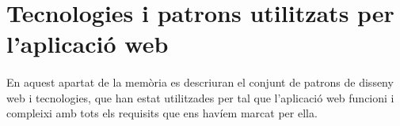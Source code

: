\section{Tecnologies i patrons utilitzats per l'aplicació web}

    \paragraph{}
    En aquest apartat de la memòria es descriuran el conjunt de patrons de disseny web i tecnologies, que han estat utilitzades per tal que l'aplicació web funcioni i compleixi amb tots els requisits que ens havíem marcat per ella.

    
    
    
    
    
    
    
    
    
    
    
